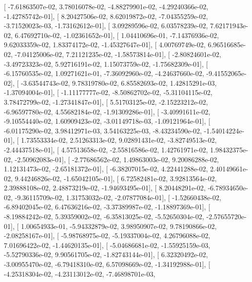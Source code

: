 \documentclass{article}
\begin{document}
       [ -7.61863507e-02,   3.78016078e-02,  -4.88279901e-02,
         -4.29240366e-02,  -1.42785742e-01],
       [  8.20427506e-02,   8.62019872e-02,  -7.04355259e-02,
         -3.71520023e-03,  -1.73162612e-01],
       [  3.09289596e-02,   6.03578239e-02,   7.62171943e-02,
          6.47692710e-02,  -1.02361652e-01],
       [  1.04410696e-01,  -7.14376936e-02,   9.62033359e-02,
          1.83374172e-02,  -1.45327647e-01],
       [  4.00769749e-02,   6.96516685e-02,  -7.04125006e-02,
          7.21121235e-02,  -1.58573814e-01],
       [ -2.80824601e-02,  -3.49723323e-02,   5.92716191e-02,
          1.15073759e-02,  -1.75682309e-01],
       [ -6.15760535e-02,   1.09271621e-01,  -7.36092960e-02,
         -4.24637660e-02,  -9.41552065e-02],
       [ -3.63544743e-02,   9.78319780e-02,   6.85582693e-02,
          1.42815291e-03,  -1.37094004e-01],
       [ -1.11177777e-02,  -8.50862702e-02,  -5.31104115e-02,
          3.78472799e-02,  -1.27341847e-01],
       [  5.51703125e-02,  -2.15223212e-02,  -6.96597780e-02,
          4.55682184e-02,  -1.91309286e-01],
       [ -3.40991611e-02,  -9.10554440e-02,   1.60909423e-02,
         -3.01149718e-03,  -1.09121964e-01],
       [ -6.01175290e-02,   3.98412971e-03,   3.54163225e-03,
         -8.43234590e-02,  -1.54014224e-01],
       [  1.73553334e-02,   2.51263313e-02,   9.02891431e-02,
         -3.82749513e-02,  -2.44437518e-01],
       [  4.57513658e-02,  -2.55816586e-02,   1.42761971e-02,
          1.98432375e-02,  -2.50962083e-01],
       [ -2.77686562e-02,   1.49863003e-02,   9.20086288e-02,
          1.12131473e-02,  -2.65181372e-01],
       [ -6.38207015e-02,   4.22441288e-02,   2.40149661e-02,
          9.44246826e-02,  -1.65042105e-01],
       [  6.72582481e-02,   3.92813564e-02,   2.39888108e-02,
          2.48873219e-02,  -1.94693495e-01],
       [  8.20448291e-02,  -6.78934650e-02,  -9.36115709e-02,
          1.31753032e-02,  -2.07877084e-01],
       [ -1.52660438e-02,  -6.89402045e-02,   6.47636216e-02,
         -3.37389987e-02,  -1.18897369e-01],
       [ -8.19884242e-02,   5.39359002e-02,  -6.35813025e-02,
         -5.52650304e-02,  -2.57655720e-01],
       [  1.00654933e-01,  -5.94332879e-02,   3.98950907e-02,
          9.78190866e-02,  -2.08258167e-01],
       [ -5.98768975e-02,  -5.19337004e-02,   4.26796088e-02,
          7.01696422e-02,  -1.44620135e-01],
       [ -5.04686681e-02,  -1.55925159e-03,  -5.52790336e-02,
          9.90561705e-02,  -1.82743144e-01],
       [  6.32320492e-02,  -3.00955470e-02,  -6.79418310e-02,
          6.57098669e-02,  -1.34192988e-01],
       [ -4.25318304e-02,  -4.23113012e-02,  -7.46898701e-03,
\end{document}
